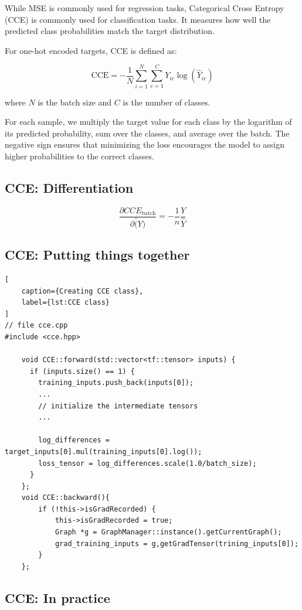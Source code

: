 While MSE is commonly used for regression tasks, Categorical Cross Entropy (CCE) is commonly used for classification tasks. It measures how well the predicted class probabilities match the target distribution.

For one-hot encoded targets, CCE is defined as:

\[
\mathrm{CCE}=-\frac{1}{N}
\sum_{i=1}^{N}\sum_{c=1}^{C}
Y_{ic}\log(\hat{Y}_{ic})
\]

where \(N\) is the batch size and \(C\) is the number of classes.

For each sample, we multiply the target value
for each class by the logarithm of its predicted
probability, sum over the classes, and average
over the batch. The negative sign ensures that
minimizing the loss encourages the model to
assign higher probabilities to the correct classes.

\subsection{CCE: Differentiation}

\[
\frac{\partial{CCE_\text{batch}}}{\partial{\hat(Y)}}= - \frac{1}{n}\frac{Y}{\hat{Y}}
\]

\subsection{CCE: Putting things together}

\begin{lstlisting}[
    caption={Creating CCE class},
    label={lst:CCE class}
]
// file cce.cpp
#include <cce.hpp>

    void CCE::forward(std::vector<tf::tensor> inputs) {
      if (inputs.size() == 1) {
        training_inputs.push_back(inputs[0]);
        ...
        // initialize the intermediate tensors
        ...

        log_differences = target_inputs[0].mul(training_inputs[0].log());
        loss_tensor = log_differences.scale(1.0/batch_size);
      }
    };
    void CCE::backward(){
        if (!this->isGradRecorded) {
            this->isGradRecorded = true;
            Graph *g = GraphManager::instance().getCurrentGraph();
            grad_training_inputs = g,getGradTensor(trining_inputs[0]);
        }
    };
\end{lstlisting}

\subsection{CCE: In practice}

